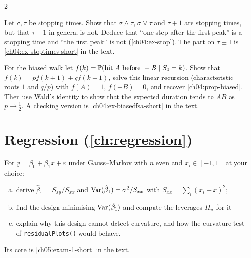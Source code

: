 \begin{paracol}{2}
\begin{exercise}\label{ch04:ex-stoptimes}
Let $\sigma,\tau$ be stopping times. Show that $\sigma\wedge\tau$, $\sigma\vee\tau$ and $\tau+1$ are stopping times, but that
$\tau-1$ in general is not. Deduce that ``one step after the first peak'' is a stopping time and ``the first peak'' is
not (\cref{ch04:ex-stop}). The part on $\tau\pm1$ is \cref{ch04:ex-stoptimes-short} in the text.
\end{exercise}

\begin{exercise}\label{ch04:ex-biasedfsa}
For the biased walk let $f(k)=\mathbb{P}(\text{hit }A\text{ before }-B\mid S_0=k)$. Show that
$f(k)=pf(k+1)+qf(k-1)$, solve this linear recursion (characteristic roots $1$ and $q/p$) with $f(A)=1$, $f(-B)=0$, and
recover \cref{ch04:prop-biased}. Then use Wald's identity to show that the expected duration tends to $AB$ as
$p\to\frac12$. A checking version is \cref{ch04:ex-biasedfsa-short} in the text.
\end{exercise}

\section{Regression (\cref{ch:regression})}\label{exam:regression}

\begin{exercise}\label{ch05:exam-1}
For $y=\beta_0+\beta_1x+\varepsilon$ under Gauss--Markov with $n$ even and $x_i\in[-1,1]$ at your choice:
\begin{enumerate}[(a)]
  \item derive
      $\hat\beta_1=S_{xy}/S_{xx}$ and $\operatorname{Var}(\hat\beta_1)=\sigma^2/S_{xx}$ with $S_{xx}=\sum_i(x_i-\bar x)^2$;
  \item find the design minimising
      $\operatorname{Var}(\hat\beta_1)$ and compute the leverages $H_{ii}$ for it;
  \item explain why this design cannot detect curvature, and how the
      curvature test of \texttt{residualPlots()} would behave.
\end{enumerate}
Its core is \cref{ch05:exam-1-short} in the text.
\end{exercise}


\end{paracol}

